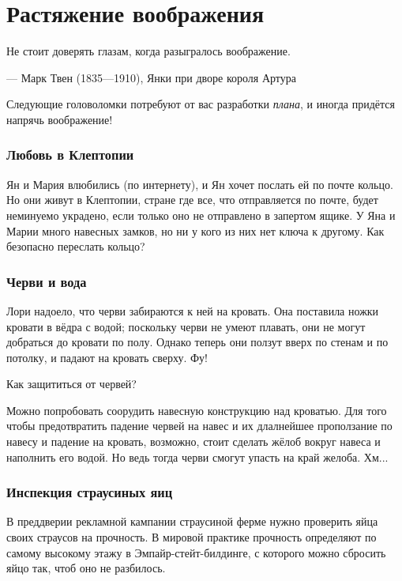 \chapter{Растяжение воображения}


\setlength{\epigraphwidth}{.80\textwidth}
\epigraph{Не стоит доверять глазам, когда разыгралось воображение.
}{--- Марк Твен (1835---1910), Янки при дворе короля Артура}

Следующие головоломки потребуют от вас разработки \emph{плана},
и иногда придётся напрячь воображение!

\subsection*{Любовь в Клептопии}

Ян и Мария влюбились (по интернету), и Ян хочет послать ей по почте кольцо.
Но они живут в Клептопии, стране где все, что отправляется по почте, будет неминуемо украдено, если только оно не отправлено в запертом ящике.
У Яна и Марии много навесных замков, но ни у кого из них нет ключа к другому.
Как безопасно переслать кольцо?

\subsection*{Черви и вода}

Лори надоело, что черви забираются к ней на кровать.
Она поставила ножки кровати в вёдра с водой;
поскольку черви не умеют плавать, они не могут добраться до кровати по полу.
Однако теперь они ползут вверх по стенам и по потолку, и падают на кровать сверху.
Фу!

Как защититься от червей?

Можно попробовать соорудить навесную конструкцию над кроватью.
Для того чтобы предотвратить падение червей на навес и их длалнейшее проползание по навесу и падение на кровать, возможно, стоит сделать жёлоб вокруг навеса и наполнить его водой.
Но ведь тогда черви смогут упасть на край желоба.
Хм...

\subsection*{Инспекция страусиных яиц}

В преддверии рекламной кампании страусиной ферме нужно проверить яйца своих страусов на прочность.
В мировой практике прочность определяют по самому высокому этажу в Эмпайр-стейт-билдинге, с которого можно сбросить яйцо так, чтоб оно не разбилось.

